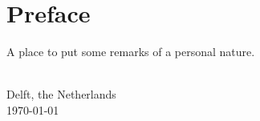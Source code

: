 
\chapter{\label{cha:Preface}Preface}

A place to put some remarks of a personal nature.

\vskip1cm 

\begin{flushright}
\theauthor\\
 Delft, the Netherlands \\
 \today\\
 
\par\end{flushright}
